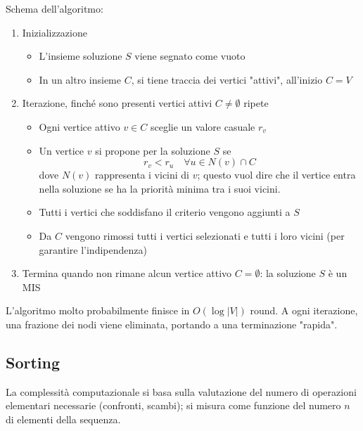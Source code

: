 Schema dell'algoritmo: 
\begin{enumerate}
    \item Inizializzazione 
    \begin{itemize}
        \item L'insieme soluzione $S$ viene segnato come vuoto
    
        \item In un altro insieme $C$, si tiene traccia dei vertici "attivi", all'inizio $C = V$
    \end{itemize}
    
    \item Iterazione, finché sono presenti vertici attivi $C \neq \emptyset$ ripete
    \begin{itemize}
        \item Ogni vertice attivo $v \in C$ sceglie un valore casuale $r_v$
        
        \item Un vertice $v$ si propone per la soluzione $S$ se 
        $$ r_v < r_u \quad \forall u \in N(v) \cap C $$
        dove $N(v)$ rappresenta i vicini di $v$; questo vuol dire che il vertice entra nella soluzione se ha la priorità minima tra i suoi vicini.
        
        \item Tutti i vertici che soddisfano il criterio vengono aggiunti a $S$
        
        \item Da $C$ vengono rimossi tutti i vertici selezionati e tutti i loro vicini (per garantire l'indipendenza)
    \end{itemize}
    
    \item Termina quando non rimane alcun vertice attivo $C = \emptyset$: la soluzione $S$ è un MIS
\end{enumerate}

L'algoritmo molto probabilmente finisce in $O(\log |V|)$ round. A ogni iterazione, una frazione dei nodi viene eliminata, portando a una terminazione "rapida".

\subsection{Sorting}

La complessità computazionale si basa sulla valutazione del numero di operazioni elementari necessarie (confronti, scambi); si misura come funzione del numero $n$ di elementi della sequenza.

